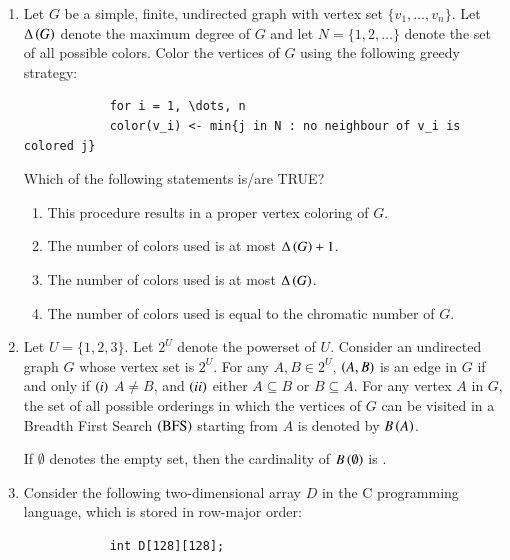 \documentclass[journal,12pt,onecolumn]{IEEEtran}
\theoremstyle{remark}
\begin{document}
\begin{enumerate}
	
		
		\item Let $G$ be a simple, finite, undirected graph with vertex set $\{v_1, \ldots, v_n\}$. Let $\Delta\left(G\right)$ denote the maximum degree of $G$ and let $N = \{1, 2, \ldots\}$ denote the set of all possible colors. Color the vertices of $G$ using the following greedy strategy:
		\begin{verbatim}
			for i = 1, \dots, n
			color(v_i) <- min{j in N : no neighbour of v_i is colored j}
		\end{verbatim}
		
		Which of the following statements is/are TRUE?
		
		\hfill{}
		
		\begin{enumerate}

				\item This procedure results in a proper vertex coloring of $G$.
				\item The number of colors used is at most $\Delta\left(G\right) + 1$.
				\item The number of colors used is at most $\Delta\left(G\right)$.
				\item The number of colors used is equal to the chromatic number of $G$.

		\end{enumerate}
		
		\item Let $U = \{1, 2, 3\}$. Let $2^U$ denote the powerset of $U$. Consider an undirected graph $G$ whose vertex set is $2^U$. For any $A, B \in 2^U$, $\left(A, B\right)$ is an edge in $G$ if and only if $\left(i\right)$ $A \neq B$, and $\left(ii\right)$ either $A \subseteq B$ or $B \subseteq A$. For any vertex $A$ in $G$, the set of all possible orderings in which the vertices of $G$ can be visited in a Breadth First Search $\left(\text{BFS}\right)$ starting from $A$ is denoted by $B\left(A\right)$.
		
		If $\emptyset$ denotes the empty set, then the cardinality of $B\left(\emptyset\right)$ is \underline{\hspace{2cm}}.
		
		\hfill{}
		
		\item Consider the following two-dimensional array $D$ in the C programming language, which is stored in row-major order:
		\begin{verbatim}
			int D[128][128];
		\end{verbatim}
		

\end{enumerate}
\end{document}
